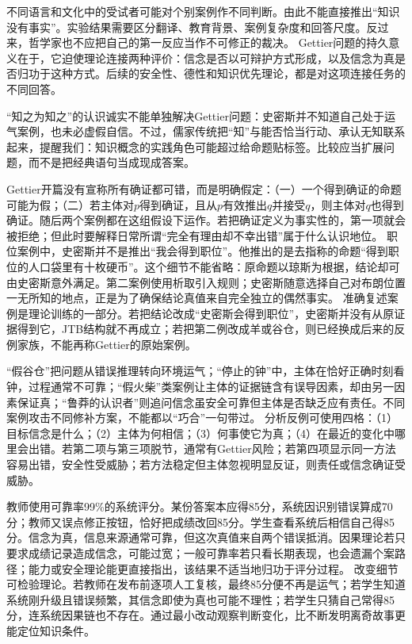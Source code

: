 不同语言和文化中的受试者可能对个别案例作不同判断。由此不能直接推出“知识没有事实”。实验结果需要区分翻译、教育背景、案例复杂度和回答尺度。反过来，哲学家也不应把自己的第一反应当作不可修正的裁决。 Gettier问题的持久意义在于，它迫使理论连接两种评价：信念是否以可辩护方式形成，以及信念为真是否归功于这种方式。后续的安全性、德性和知识优先理论，都是对这项连接任务的不同回答。

\begin{comparison}
“知之为知之”的认识诚实不能单独解决Gettier问题\parencite[2.17]{analects2003}：史密斯并不知道自己处于运气案例，也未必虚假自信。不过，儒家传统把“知”与能否恰当行动、承认无知联系起来，提醒我们：知识概念的实践角色可能超过给命题贴标签。比较应当扩展问题，而不是把经典语句当成现成答案。
\end{comparison}

Gettier开篇没有宣称所有确证都可错，而是明确假定：（一）一个得到确证的命题可能为假；（二）若主体对$p$得到确证，且从$p$有效推出$q$并接受$q$，则主体对$q$也得到确证\parencite[121]{gettier1963}。随后两个案例都在这组假设下运作。若把确证定义为事实性的，第一项就会被拒绝；但此时要解释日常所谓“完全有理由却不幸出错”属于什么认识地位。 职位案例中，史密斯并不是推出“我会得到职位”。他推出的是去指称的命题“得到职位的人口袋里有十枚硬币”。这个细节不能省略：原命题以琼斯为根据，结论却可由史密斯意外满足。第二案例使用析取引入规则；史密斯随意选择自己对布朗位置一无所知的地点，正是为了确保结论真值来自完全独立的偶然事实。 准确复述案例是理论训练的一部分。若把结论改成“史密斯会得到职位”，史密斯并没有从原证据得到它，JTB结构就不再成立；若把第二例改成羊或谷仓，则已经换成后来的反例家族，不能再称Gettier的原始案例。

“假谷仓”把问题从错误推理转向环境运气；“停止的钟”中，主体在恰好正确时刻看钟，过程通常不可靠；“假火柴”类案例让主体的证据链含有误导因素，却由另一因素保证真；“鲁莽的认识者”则追问信念虽安全可靠但主体是否缺乏应有责任。不同案例攻击不同修补方案，不能都以“巧合”一句带过。 分析反例可使用四格：（1）目标信念是什么；（2）主体为何相信；（3）何事使它为真；（4）在最近的变化中哪里会出错。若第二项与第三项脱节，通常有Gettier风险；若第四项显示同一方法容易出错，安全性受威胁；若方法稳定但主体忽视明显反证，则责任或信念确证受威胁。

教师使用可靠率99\%的系统评分。某份答案本应得85分，系统因识别错误算成70分；教师又误点修正按钮，恰好把成绩改回85分。学生查看系统后相信自己得85分。信念为真，信息来源通常可靠，但这次真值来自两个错误抵消。因果理论若只要求成绩记录造成信念，可能过宽；一般可靠率若只看长期表现，也会遗漏个案路径；能力或安全理论能更直接指出，该结果不适当地归功于评分过程。 改变细节可检验理论。若教师在发布前逐项人工复核，最终85分便不再是运气；若学生知道系统刚升级且错误频繁，其信念即使为真也可能不理性；若学生只猜自己常得85分，连系统因果链也不存在。通过最小改动观察判断变化，比不断发明离奇故事更能定位知识条件。
